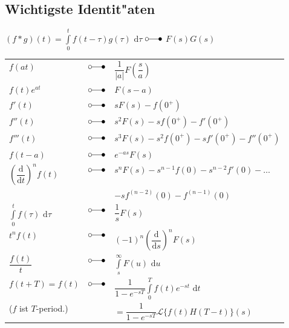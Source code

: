 \subsection{Wichtigste Identit"aten}
\hspace*{1mm} \( (f*g)(t) =\int\limits_0^t f(t-\tau)g(\tau)\text{ d}\tau\) \hspace{2mm} \( \laplace \) \hspace{2mm} \( F(s)G(s) \)\\
\begin{tabular}{lcl}
\( f(at) \)		&	\( \laplace \)	&	\( \dfrac{1}{|a|}F(\dfrac{s}{a}) \)\\
\( f(t)e^{at} \)	&	\( \laplace \)	&	\( F(s-a) \)\\
\( f'(t) \)		&	\( \laplace \)	&	\( sF(s) - f(0^+) \)\\
\( f''(t) \)		&	\( \laplace \)	&	\( s^2F(s) - s f(0^+) - f'(0^+) \)\\
\( f'''(t) \)		&	\( \laplace \)	&	\( s^3F(s) - s^2f(0^+) - s f'(0^+) - f''(0^+) \)\\
\(f(t-a)\)		&	\( \laplace \)	&	\(e^{-as}F(s)\)\\
\(\left(\dfrac{\text{d}}{\text{d}t}\right)^n f(t)\)
&	\( \laplace \)	&	\(s^nF(s)-s^{n-1}f(0)-s^{n-2}f'(0)-\dots\)\\
&				&	\(-sf^{(n-2)}(0)-f^{(n-1)}(0)\)\\
\(\displaystyle\int\limits_0^t f(\tau) \text{ d}\tau\)
&	\( \laplace \)	&	\(\dfrac{1}{s}F(s)\)\\
\(t^nf(t)\)		&	\( \laplace \)	&	\((-1)^n\left(\dfrac{\text{d}}{\text{d}s}\right)^n F(s)\)\\
\(\dfrac{f(t)}{t}\)	&	\( \laplace \)	&	\(\int\limits_s^\infty F(u) \text{ d}u\)\\
\(f(t+T) = f(t)\)	&	\( \laplace \)	&	\(\dfrac{1}{1-e^{-sT}}\int\limits_0^Tf(t)e^{-st}\text{ d}t\)\\
(\(f\) ist \(T\)-period.)	&			&	\(=\dfrac{1}{1-e^{-sT}}\mathcal{L}\{f(t)H(T-t)\}(s)\)
\end{tabular}

